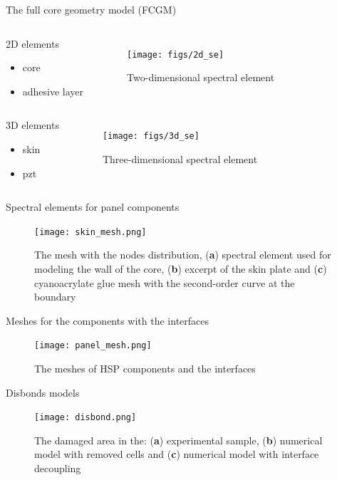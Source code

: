 \documentclass[10pt]{beamer} %
\begin{document}
\begin{frame}[label=frame8]{The full core geometry model (FCGM)}
		\begin{columns}[T]
		\begin{alertblock}{2D elements}
			\begin{itemize}
				\item core
				\item adhesive layer
			\end{itemize}
		\end{alertblock}
		\begin{figure}
			\texttt{[image: figs/2d\_se]}
			\caption{Two-dimensional spectral element}
			\label{fig:2dse}
		\end{figure}
	\end{columns}
	\begin{columns}[T]
		\begin{alertblock}{3D elements}
			\begin{itemize}
				\item skin
				\item pzt
			\end{itemize}
		\end{alertblock}
		\begin{figure}
			\centering
			\texttt{[image: figs/3d\_se]}
			\caption{Three-dimensional spectral element}
			\label{fig:3dse}
		\end{figure}
	\end{columns}
\end{frame}
\begin{frame}[label=frame9]{Spectral elements for panel components}
		\begin{figure}
			\texttt{[image: skin\_mesh.png]}
			\caption{The mesh with the nodes distribution, (\textbf{a}) spectral element used for modeling the wall of the core, (\textbf{b}) excerpt of the skin plate and (\textbf{c}) cyanoacrylate glue mesh with the second-order curve at the boundary}
			\label{fig:meshes}
		\end{figure}
\end{frame}
\begin{frame}[label=frame10]{Meshes for the components with the interfaces}
	\begin{figure}
		\texttt{[image: panel\_mesh.png]}
		\caption{The meshes of HSP components and the interfaces}
		\label{fig:panel_mesh}
	\end{figure}
\end{frame}
\begin{frame}[label=frame11]{Disbonds models}
	\begin{figure}
		\texttt{[image: disbond.png]}
		\caption{The damaged area in the: (\textbf{a}) experimental sample, (\textbf{b}) numerical model with removed cells and (\textbf{c}) numerical model with interface decoupling}
		\label{fig:disbonds}
	\end{figure}
\end{frame}
\end{document}
